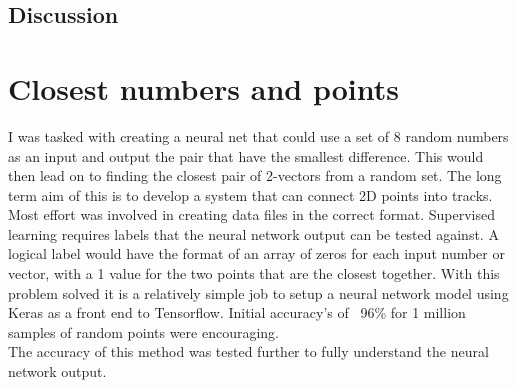 \subsection{Discussion}


\section{Closest numbers and points} %
I was tasked with creating a neural net that could use a set of 8 random numbers as an input and output the pair that have the smallest difference. This would then lead on to finding the closest pair of 2-vectors from a random set. The long term aim of this is to develop a system that can connect 2D points into tracks.
Most effort was involved in creating data files in the correct format. Supervised learning requires labels that the neural network output can be tested against. A logical label would have the format of an array of zeros for each input number or vector, with a 1 value for the two points that are the closest together. With this problem solved it is a relatively simple job to setup a neural network model using Keras as a front end to Tensorflow. Initial accuracy's of ~96\% for 1 million samples of random points were encouraging.\\

The accuracy of this method was tested further to fully understand the neural network output.

